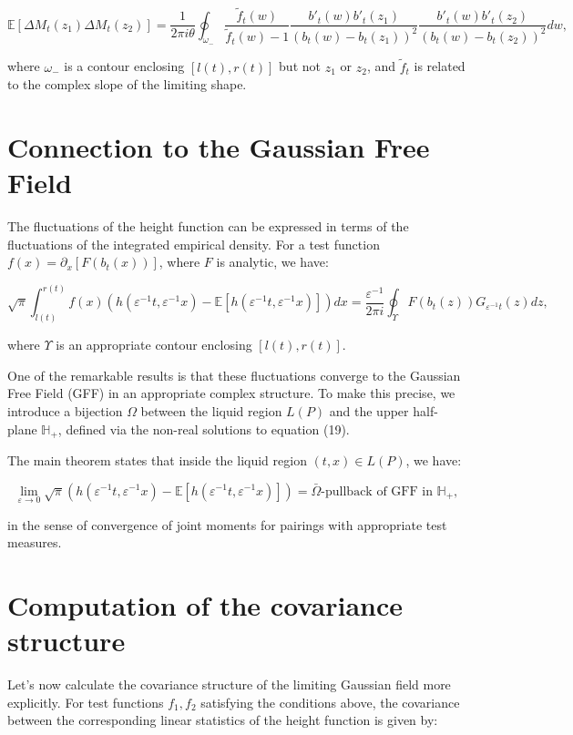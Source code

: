 \documentclass[letterpaper,11pt,oneside,reqno]{article}
\numberwithin{equation}{section}
\theoremstyle{definition}
\begin{document}
$$\mathbb{E}[\Delta M_t(z_1)\Delta M_t(z_2)] = \frac{1}{2\pi i\theta} \oint_{\omega_-} \frac{\tilde{f}_t(w)}{\tilde{f}_t(w) - 1} \frac{b'_t(w)b'_t(z_1)}{(b_t(w) - b_t(z_1))^2} \frac{b'_t(w)b'_t(z_2)}{(b_t(w) - b_t(z_2))^2}dw,$$

where $\omega_-$ is a contour enclosing $[l(t), r(t)]$ but not $z_1$ or $z_2$, and $\tilde{f}_t$ is related to the complex slope of the limiting shape.

\section{Connection to the Gaussian Free Field}

The fluctuations of the height function can be expressed in terms of the fluctuations of the integrated empirical density. For a test function $f(x) = \partial_x[F(b_t(x))]$, where $F$ is analytic, we have:

$$\sqrt{\pi}\int_{l(t)}^{r(t)} f(x)(h(\varepsilon^{-1}t, \varepsilon^{-1}x) - \mathbb{E}[h(\varepsilon^{-1}t, \varepsilon^{-1}x)])dx = \frac{\varepsilon^{-1}}{2\pi i} \oint_{\Upsilon} F(b_t(z))G_{\varepsilon^{-1}t}(z)dz,$$

where $\Upsilon$ is an appropriate contour enclosing $[l(t), r(t)]$.

One of the remarkable results is that these fluctuations converge to the Gaussian Free Field (GFF) in an appropriate complex structure. To make this precise, we introduce a bijection $\Omega$ between the liquid region $L(P)$ and the upper half-plane $\mathbb{H}_+$, defined via the non-real solutions to equation (19).

The main theorem states that inside the liquid region $(t,x) \in L(P)$, we have:

$$\lim_{\varepsilon \to 0} \sqrt{\pi}(h(\varepsilon^{-1}t, \varepsilon^{-1}x) - \mathbb{E}[h(\varepsilon^{-1}t, \varepsilon^{-1}x)]) = \bar{\Omega}\text{-pullback of GFF in } \mathbb{H}_+,$$

in the sense of convergence of joint moments for pairings with appropriate test measures.

\section{Computation of the covariance structure}

Let's now calculate the covariance structure of the limiting Gaussian field more explicitly. For test functions $f_1, f_2$ satisfying the conditions above, the covariance between the corresponding linear statistics of the height function is given by:
\end{document}

